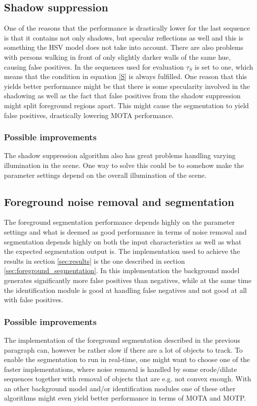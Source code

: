 


\subsection{Shadow suppression}
One of the reasons that the performance is drastically lower for the last sequence is that it contains not only shadows, but specular reflections as well and this is something the HSV model does not take into account. There are also problems with persons walking in front of only slightly darker walls of the same hue, causing false positives. In the sequences used for evaluation $\tau_S$ is set to one, which means that the condition in equation \eqref{S} is always fulfilled. One reason that this yields better performance might be that there is some specularity involved in the shadowing as well as the fact that false positives from the shadow suppression might split foreground regions apart. This might cause the segmentation to yield false positives, drastically lowering MOTA performance.

\subsubsection{Possible improvements}
The shadow suppression algorithm also has great problems handling varying illumination in the scene. One way to solve this could be to somehow make the parameter settings depend on the overall illumination of the scene. 

\subsection{Foreground noise removal and segmentation}
The foreground segmentation performance depends highly on the parameter settings and what is deemed as good performance in terms of noise removal and segmentation depends highly on both the input characteristics as well as what the expected segmentation output is. The implementation used to achieve the results in section \ref{sec:results}  is the one  described in section \ref{sec:foreground_segmentation}. In this implementation the background model generates significantly more false positives than negatives, while at the same time the identification module is good at handling false negatives and not good at all with false positives. 

\subsubsection{Possible improvements}
The implementation of the foreground segmentation described in the previous paragraph can, however be rather slow if there are a lot of objects to track. To enable the segmentation to run in real-time, one might want to choose one of the faster implementations, where noise removal is handled by some erode/dilate sequences together with removal of objects that are e.g. not convex enough. With an other background model and/or identification modules one of these other algorithms might even yield better performance in terms of MOTA and MOTP.